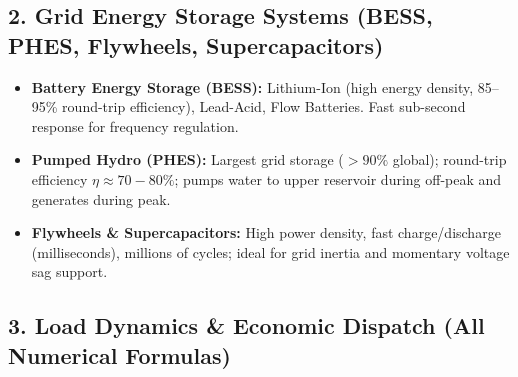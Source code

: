 \documentclass[10pt,a4paper]{article}
\begin{document}
\subsection{2. Grid Energy Storage Systems (BESS, PHES, Flywheels, Supercapacitors)}
\begin{itemize}
  \item \textbf{Battery Energy Storage (BESS):} Lithium-Ion (high energy density, 85--95\% round-trip efficiency), Lead-Acid, Flow Batteries. Fast sub-second response for frequency regulation.
  \item \textbf{Pumped Hydro (PHES):} Largest grid storage ($>90\%$ global); round-trip efficiency $\eta \approx 70-80\%$; pumps water to upper reservoir during off-peak and generates during peak.
  \item \textbf{Flywheels \& Supercapacitors:} High power density, fast charge/discharge (milliseconds), millions of cycles; ideal for grid inertia and momentary voltage sag support.
\end{itemize}

\subsection{3. Load Dynamics \& Economic Dispatch (All Numerical Formulas)}
\end{document}
